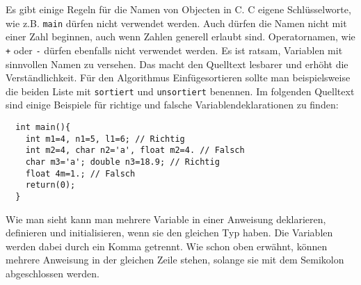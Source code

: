 Es gibt einige Regeln für die Namen von Objecten in C. 
C eigene Schlüsselworte, wie z.B. \texttt{main} dürfen nicht verwendet werden.
Auch dürfen die Namen nicht mit einer Zahl beginnen, auch wenn Zahlen generell erlaubt sind.
Operatornamen, wie \verb|+| oder \verb|-| dürfen ebenfalls nicht verwendet werden.
Es ist ratsam, Variablen mit sinnvollen Namen zu versehen.
Das macht den Quelltext lesbarer und erhöht die Verständlichkeit.
Für den Algorithmus Einfügesortieren sollte man beispielsweise die beiden Liste mit \texttt{sortiert} und \texttt{unsortiert} benennen.
Im folgenden Quelltext sind einige Beispiele für richtige und falsche Variablendeklarationen zu finden:
\begin{lstlisting}
  int main(){
    int m1=4, n1=5, l1=6; // Richtig
    int m2=4, char n2='a', float m2=4. // Falsch
    char m3='a'; double n3=18.9; // Richtig
    float 4m=1.; // Falsch
    return(0);
  }
\end{lstlisting} 
Wie man sieht kann man mehrere Variable in einer Anweisung deklarieren, definieren und initialisieren, wenn sie den gleichen Typ haben.
Die Variablen werden dabei durch ein Komma getrennt.
Wie schon oben erwähnt, können mehrere Anweisung in der gleichen Zeile stehen, solange sie mit dem Semikolon abgeschlossen werden.

